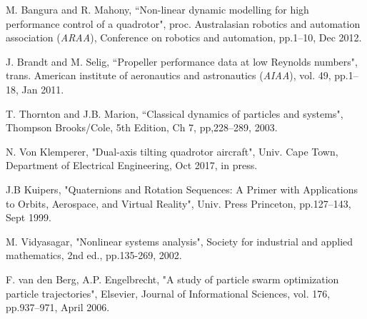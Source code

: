 \documentclass[a4paper, 10pt, conference]{ieeeconf}
\begin{document}
\begin{thebibliography}{00}
 M. Bangura and R. Mahony, ``Non-linear dynamic modelling for high performance control of a quadrotor", proc. Australasian robotics and automation association (\emph{ARAA}), Conference on robotics and automation, pp.1--10, Dec 2012.

 J. Brandt and M. Selig, ``Propeller performance data at low Reynolds numbers", trans. American institute of aeronautics and astronautics (\emph{AIAA}), vol. 49, pp.1--18, Jan 2011.

 T. Thornton and J.B. Marion, ``Classical dynamics of particles and systems", Thompson Brooks/Cole, 5th Edition, Ch 7, pp,228--289, 2003.

 N. Von Klemperer, "Dual-axis tilting quadrotor aircraft", Univ. Cape Town, Department of Electrical Engineering, Oct 2017, in press.

J.B Kuipers, "Quaternions and Rotation Sequences: A Primer with
Applications to Orbits, Aerospace, and Virtual Reality", Univ. Press Princeton, pp.127--143, Sept 1999.

 M. Vidyasagar, "Nonlinear systems analysis", Society for industrial and applied mathematics, 2nd ed., pp.135-269, 2002.

 F. van den Berg, A.P. Engelbrecht, "A study of particle swarm optimization particle trajectories", Elsevier, Journal of Informational Sciences, vol. 176, pp.937--971, April 2006.
\end{thebibliography}
\end{document}
